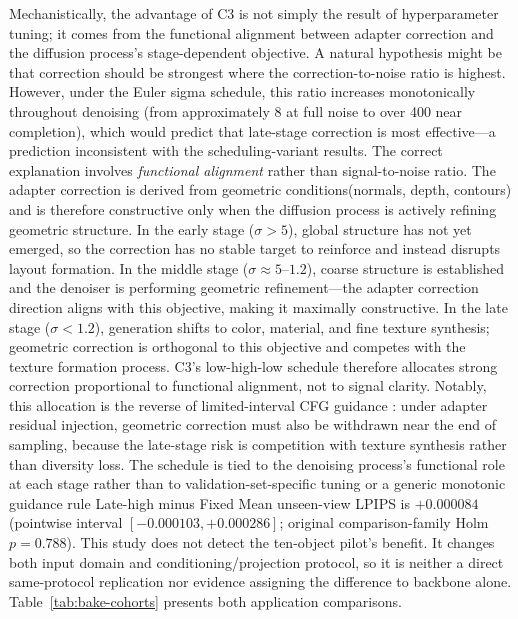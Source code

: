 \documentclass[times,twocolumn,final]{elsarticle}
\providecommand{\DIFadd}[1]{{\protect\color{blue} \sf #1}} %
\providecommand{\DIFdel}[1]{{\protect\color{red} \scriptsize #1}} %
\providecommand{\DIFaddbegin}{} %
\providecommand{\DIFdelbegin}{} %
\providecommand{\DIFdelend}{} %
\begin{document}
\DIFdelbegin \DIFdel{Mechanistically, the advantage of C3 is not simply the result of hyperparameter tuning; it comes from the functional alignment between adapter correction and the diffusion process's stage-dependent objective. A natural hypothesis might be that correction should be strongest where the correction-to-noise ratio is highest. However, under the Euler sigma schedule, this ratio increases monotonically throughout denoising (from approximately 8 at full noise to over 400 near completion), which would predict that late-stage correction is most effective---a prediction inconsistent with the scheduling-variant results. The correct explanation involves \emph{functional alignment} rather than signal-to-noise ratio.
The adapter correction is derived from geometric conditions(normals, depth, contours) and is therefore constructive only when the diffusion process is actively refining geometric structure. In the early stage ($\sigma > 5$), global structure has not yet emerged, so the correction has no stable target to reinforce and instead disrupts layout formation. In the middle stage ($\sigma \approx 5$--$1.2$), coarse structure is established and the denoiser is performing geometric refinement---the adapter correction direction aligns with this objective, making it maximally constructive. In the late stage ($\sigma < 1.2$), generation shifts to color, material, and fine texture synthesis; geometric correction is orthogonal to this objective and competes with the texture formation process. C3's low-high-low schedule therefore allocates strong correction proportional to functional alignment, not to signal clarity. Notably, this allocation is the reverse of limited-interval CFG guidance \cite{kynkanniemi2024limited}: under adapter residual injection, geometric correction must also be withdrawn near the end of sampling, because the late-stage risk is competition with texture synthesis rather than diversity loss. The schedule is tied to the denoising process's functional role at each stage rather than to validation-set-specific tuning or a generic monotonic guidance rule}\DIFdelend \DIFaddbegin \DIFadd{Late-high minus Fixed Mean unseen-view LPIPS is $+0.000084$ (pointwise interval $[-0.000103,+0.000286]$; original comparison-family Holm $p=0.788$). This study does not detect the ten-object pilot's benefit. It changes both input domain and conditioning/projection protocol, so it is neither a direct same-protocol replication nor evidence assigning the difference to backbone alone. Table~\ref{tab:bake-cohorts} presents both application comparisons.
}
\end{document}
